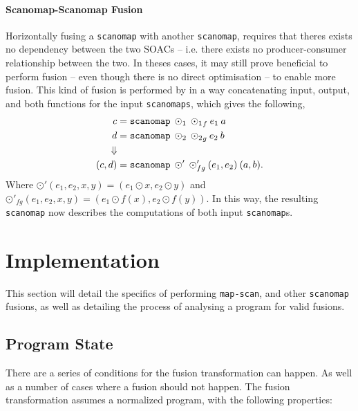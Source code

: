 \documentclass[11pt]{article}
\begin{document}
\paragraph{Scanomap-Scanomap Fusion} Horizontally fusing a \texttt{scanomap} with another \texttt{scanomap}, requires that theres exists no dependency between the
 two SOACs -- i.e. there exists no producer-consumer relationship between the two. In theses cases, it may still prove beneficial to perform fusion -- even though there is no direct
 optimisation -- to enable more fusion.
This kind of fusion is performed by in a way concatenating input, output, and both functions for the input \texttt{scanomaps}, which gives the following,
\begin{align*}
  c &= \mathtt{scanomap} \: \odot_1 \: {\odot_1}_f \: e_1 \: a \\
  d &= \mathtt{scanomap} \: \odot_2 \: {\odot_2}_g \: e_2 \: b \\
\Downarrow \\
  (c,d) &= \mathtt{scanomap} \: \odot' \: \odot'_{fg} \: (e_1, e_2) \: (a, b)\mathnormal{.}
\end{align*}
Where $\odot'(e_1,e_2, x, y) = (e_1 \odot x, e_2 \odot y)$ and $\odot'_{fg}(e_1, e_2, x, y) = (e_1 \odot f(x), e_2 \odot f(y))$. In this way, the resulting \texttt{scanomap}
 now describes the computations of both input \texttt{scanomap}s.
\section{Implementation}
This section will detail the specifics of performing \texttt{map-scan}, and other \texttt{scanomap} fusions, as well as detailing the process of
analysing a program for valid fusions.

\subsection{Program State}
There are a series of conditions for the fusion transformation can happen. As well as a number of cases where a fusion should not happen. The fusion transformation assumes a normalized program, with the following properties: \cite[Figure 5, page 4]{T2Fusion} 
\end{document}
